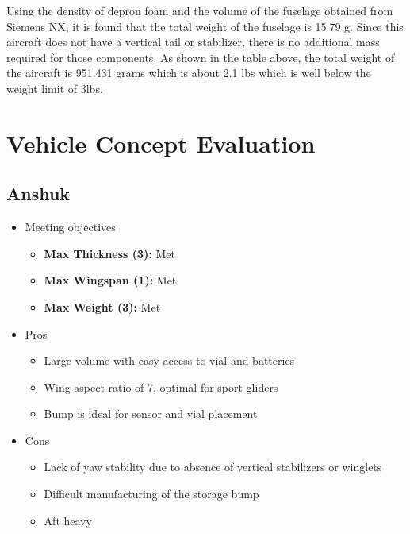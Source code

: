         Using the density of depron foam and the volume of the fuselage obtained from Siemens NX, it is found that the total weight of the fuselage is 15.79 g. Since this aircraft does not have a vertical tail or stabilizer, there is no additional mass required for those components. As shown in the table above, the total weight of the aircraft is 951.431 grams which is about 2.1 lbs which is well below the weight limit of 3lbs. 

\section{Vehicle Concept Evaluation}

    \subsection{Anshuk}
        \begin{itemize}
            \item Meeting objectives
            \begin{itemize}
                \item \textbf{Max Thickness (3):} Met
                \item \textbf{Max Wingspan (1):} Met
                \item \textbf{Max Weight (3):} Met
            \end{itemize}
            \item Pros
            \begin{itemize}
                \item Large volume with easy access to vial and batteries
                \item Wing aspect ratio of 7, optimal for sport gliders
                \item Bump is ideal for sensor and vial placement
            \end{itemize}
            \item Cons
            \begin{itemize}
                \item Lack of yaw stability due to absence of vertical stabilizers or winglets
                \item Difficult manufacturing of the storage bump
                \item Aft heavy
            \end{itemize}
        \end{itemize}
        
